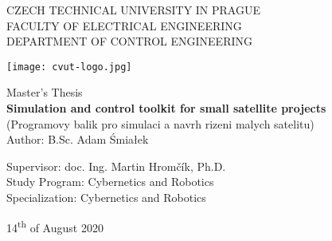 \begin{titlepage}
    \centering

    {\Large CZECH TECHNICAL UNIVERSITY IN PRAGUE}\\[0.3cm]
    {\large FACULTY OF ELECTRICAL ENGINEERING}\\[0.3cm]
    {\large DEPARTMENT OF CONTROL ENGINEERING}\\

    \vfill

    \texttt{[image: cvut-logo.jpg]}\\

    \vfill

    {\large Master's Thesis}\\[0.3cm]
    {\huge \textbf{Simulation and control toolkit for small satellite projects}}\\[0.3cm]
    {\Large(Programovy balik pro simulaci a navrh rizeni malych satelitu)}\\[0.3cm]
    {\large Author: B.Sc. Adam Śmiałek}

    \vfill

    Supervisor: doc. Ing. Martin Hromčík, Ph.D.\\[0.6cm]  
    Study Program: Cybernetics and Robotics\\[0.2cm]  
    Specialization: Cybernetics and Robotics\\

    \vfill

    14\textsuperscript{th} of August 2020
\end{titlepage}